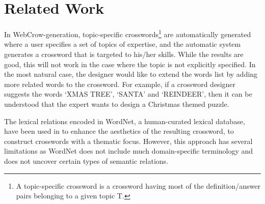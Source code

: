 \documentclass[twoside]{article}
\begin{document}
\section{Related Work}
\label{sec:sec2}
In WebCrow-generation\cite{cite7}, topic-specific crosswords\footnote{ A topic-specific crossword is a crossword having most of the definition/answer pairs belonging to a given topic T.}  are automatically generated where a user specifies a set of topics of expertise, and the automatic system generates a crossword that is targeted to his/her skills. While the results are good, this will not work in the case where the topic is not explicitly specified. In the most natural case, the designer would like to extend the words list by adding more related words to the crossword. For example, if a crossword designer suggests the words ‘XMAS TREE’, ‘SANTA’ and ‘REINDEER’, then it can be understood that the expert wants to design a Christmas themed puzzle.

The lexical relations encoded in WordNet,  a human-curated lexical database,  have been used in \cite{cite8} to enhance the aesthetics of the resulting crossword, to construct crosswords with a thematic focus. However, this approach has several limitations as WordNet does not include much domain-specific terminology and does not uncover certain types of semantic relations.
\end{document}
